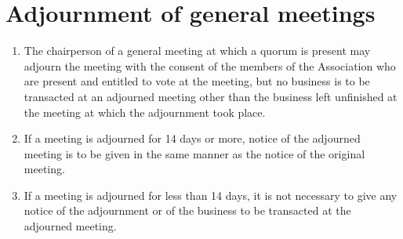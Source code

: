 \section{Adjournment of general meetings}
\label{rule:adjournment}

\begin{enumerate}
	\item The chairperson of a general meeting at which a quorum is present may adjourn the meeting with the consent of the members of the Association who are present and entitled to vote at the meeting, but no business is to be transacted at an adjourned meeting other than the business left unfinished at the meeting at which the adjournment took place.
	\item If a meeting is adjourned for 14 days or more, notice of the adjourned meeting is to be given in the same manner as the notice of the original meeting.
	\item If a meeting is adjourned for less than 14 days, it is not necessary to give any notice of the adjournment or of the business to be transacted at the adjourned meeting.
\end{enumerate}